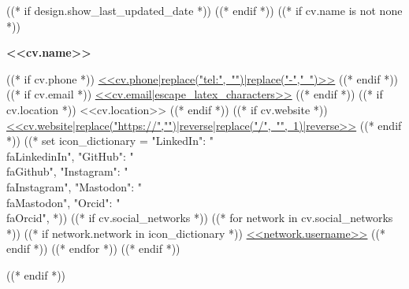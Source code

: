((* if design.show_last_updated_date *))
\placelastupdatedtext
((* endif *))
((* if cv.name is not none *))
\begin{header}
    \fontsize{<<design.header_font_size>>}{<<design.header_font_size>>}
    \textbf{<<cv.name>>}

    \vspace{<<design.margins.header.vertical_between_name_and_connections>>}

    \normalsize
((* if cv.phone *))
    \mbox{\href{<<cv.phone|replace("-","")>>}{\color{black}{\footnotesize\faPhone*}\hspace*{0.13cm}<<cv.phone|replace("tel:", "")|replace("-"," ")>>}}
    \hspace*{<<design.margins.header.horizontal_between_connections>>}
((* endif *))
((* if cv.email *))
    \mbox{\href{mailto:<<cv.email>>}{\color{black}{\small\faEnvelope[regular]}\hspace*{0.13cm}<<cv.email|escape_latex_characters>>}}
    \hspace*{<<design.margins.header.horizontal_between_connections>>}
((* endif *))
((* if cv.location *))
    \mbox{\color{black}{\small\faMapMarker*}\hspace*{0.13cm}<<cv.location>>}
    \hspace*{<<design.margins.header.horizontal_between_connections>>}
((* endif *))
((* if cv.website *))
    \mbox{\href{<<cv.website>>}{\color{black}{\small\faLink}\hspace*{0.13cm}<<cv.website|replace("https://","")|reverse|replace("/", "", 1)|reverse>>}}
    \hspace*{<<design.margins.header.horizontal_between_connections>>}
((* endif *))
((*
    set icon_dictionary = {
        "LinkedIn": "\\faLinkedinIn",
        "GitHub": "\\faGithub",
        "Instagram": "\\faInstagram",
        "Mastodon": "\\faMastodon",
        "Orcid": "\\faOrcid",
    }
*))
((* if cv.social_networks *))
    ((* for network in cv.social_networks *))
        ((* if network.network in icon_dictionary *))
    \mbox{\href{<<network.url>>}{\color{black}{\small<<icon_dictionary[network.network]>>}\hspace*{0.13cm}<<network.username>>}}
    \hspace*{<<design.margins.header.horizontal_between_connections>>}
        ((* endif *))
    ((* endfor *))
((* endif *))
\end{header}

\vspace{<<design.margins.header.bottom>>}
((* endif *))